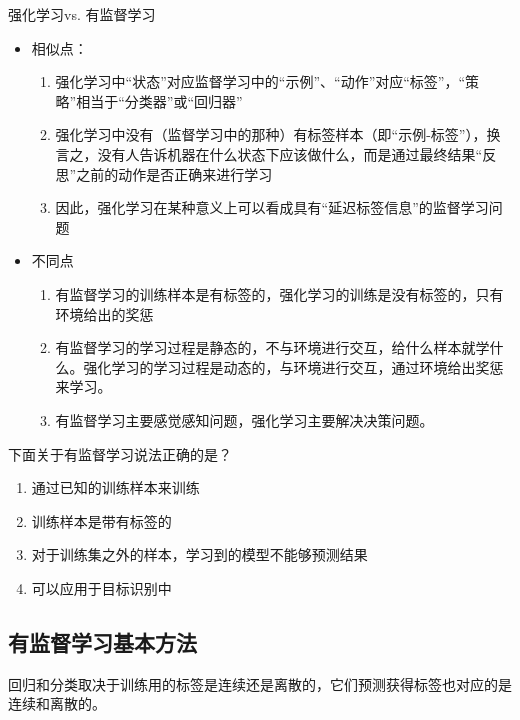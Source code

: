 \textcolor{main1}{强化学习vs. 有监督学习}
\begin{itemize}
    \item 相似点：
    \begin{enumerate}
        \item 强化学习中“状态”对应监督学习中的“示例”、“动作”对应“标签”，“策略”相当于“分类器”或“回归器”
        \item 强化学习中没有（监督学习中的那种）有标签样本（即“示例-标签”），换言之，没有人告诉机器在什么状态下应该做什么，而是通过最终结果“反思”之前的动作是否正确来进行学习
        \item 因此，强化学习在某种意义上可以看成具有“延迟标签信息”的监督学习问题
    \end{enumerate} 
    \item 不同点
    \begin{enumerate}
        \item 有监督学习的训练样本是有标签的，强化学习的训练是没有标签的，只有环境给出的奖惩
        \item 有监督学习的学习过程是静态的，不与环境进行交互，给什么样本就学什么。强化学习的学习过程是动态的，与环境进行交互，通过环境给出奖惩来学习。
        \item 有监督学习主要感觉感知问题，强化学习主要解决决策问题。
    \end{enumerate}
\end{itemize}
\begin{example}
    下面关于有监督学习说法正确的是？
    \begin{enumerate}[A]
        \item \textcolor{main1}{通过已知的训练样本来训练}
        \item \textcolor{main1}{训练样本是带有标签的}
        \item 对于训练集之外的样本，学习到的模型不能够预测结果
        \item \textcolor{main1}{可以应用于目标识别中}
    \end{enumerate}
\end{example}
\subsection{有监督学习基本方法}
回归和分类取决于训练用的标签是连续还是离散的，它们预测获得标签也对应的是连续和离散的。

